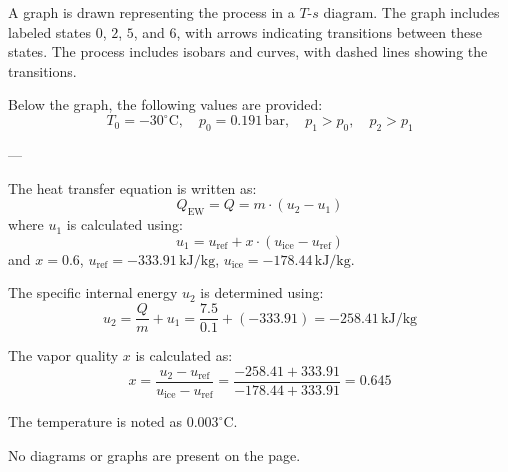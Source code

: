 A graph is drawn representing the process in a \( T \)-\( s \) diagram. The graph includes labeled states \( 0 \), \( 2 \), \( 5 \), and \( 6 \), with arrows indicating transitions between these states. The process includes isobars and curves, with dashed lines showing the transitions.  

Below the graph, the following values are provided:  
\[
T_0 = -30^\circ\text{C}, \quad p_0 = 0.191 \, \text{bar}, \quad p_1 > p_0, \quad p_2 > p_1
\]

---

The heat transfer equation is written as:  
\[
Q_{\text{EW}} = Q = m \cdot (u_2 - u_1)
\]  
where \( u_1 \) is calculated using:  
\[
u_1 = u_{\text{ref}} + x \cdot (u_{\text{ice}} - u_{\text{ref}})
\]  
and \( x = 0.6 \), \( u_{\text{ref}} = -333.91 \, \text{kJ/kg} \), \( u_{\text{ice}} = -178.44 \, \text{kJ/kg} \).  

The specific internal energy \( u_2 \) is determined using:  
\[
u_2 = \frac{Q}{m} + u_1 = \frac{7.5}{0.1} + (-333.91) = -258.41 \, \text{kJ/kg}
\]  

The vapor quality \( x \) is calculated as:  
\[
x = \frac{u_2 - u_{\text{ref}}}{u_{\text{ice}} - u_{\text{ref}}} = \frac{-258.41 + 333.91}{-178.44 + 333.91} = 0.645
\]  

The temperature is noted as \( 0.003^\circ\text{C} \).  

No diagrams or graphs are present on the page.